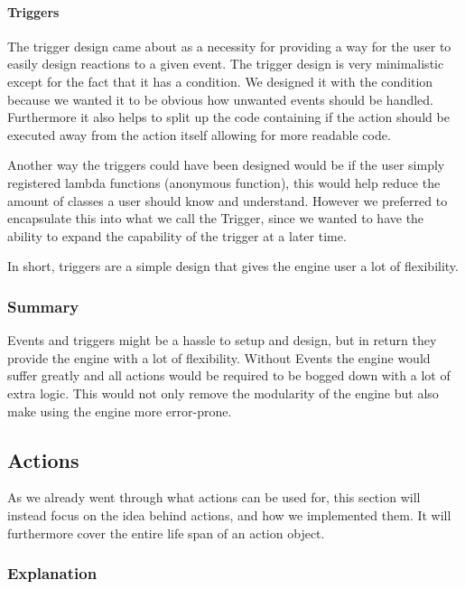 \paragraph*{Triggers}

The trigger design came about as a necessity for providing a way for
the user to easily design reactions to a given event. The trigger
design is very minimalistic except for the fact that it has a condition.
We designed it with the condition because we wanted it to be obvious
how unwanted events should be handled. Furthermore it also helps to
split up the code containing if the action should be executed away
from the action itself allowing for more readable code. 

Another way the triggers could have been designed would be if the
user simply registered lambda functions (anonymous function), this
would help reduce the amount of classes a user should know and understand.
However we preferred to encapsulate this into what we call the Trigger,
since we wanted to have the ability to expand the capability of the
trigger at a later time.

In short, triggers are a simple design that gives the engine user
a lot of flexibility. 


\subsubsection*{Summary}

Events and triggers might be a hassle to setup and design, but in
return they provide the engine with a lot of flexibility. Without
Events the engine would suffer greatly and all actions would be required
to be bogged down with a lot of extra logic. This would not only remove
the modularity of the engine but also make using the engine more error-prone.


\subsection{Actions}

As we already went through what actions can be used for, this section
will instead focus on the idea behind actions, and how we implemented
them. It will furthermore cover the entire life span of an action
object.


\subsubsection*{Explanation}

